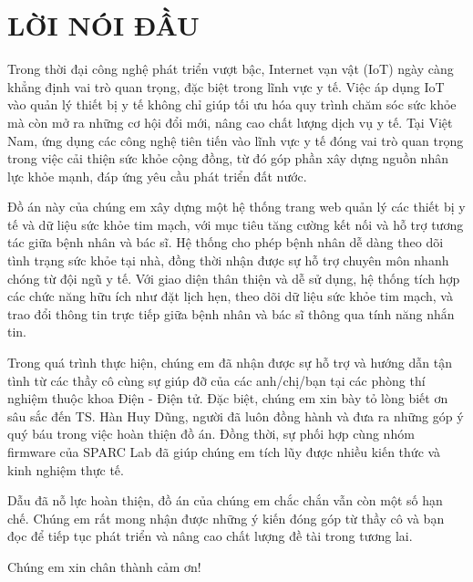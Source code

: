 \section*{LỜI NÓI ĐẦU} %
\thispagestyle{empty}
Trong thời đại công nghệ phát triển vượt bậc, Internet vạn vật (IoT) ngày càng khẳng định vai trò quan trọng, đặc biệt trong lĩnh vực y tế. Việc áp dụng IoT vào quản lý thiết bị y tế không chỉ giúp tối ưu hóa quy trình chăm sóc sức khỏe mà còn mở ra những cơ hội đổi mới, nâng cao chất lượng dịch vụ y tế.
Tại Việt Nam, ứng dụng các công nghệ tiên tiến vào lĩnh vực y tế đóng vai trò quan trọng trong việc cải thiện sức khỏe cộng đồng, từ đó góp phần xây dựng nguồn nhân lực khỏe mạnh, đáp ứng yêu cầu phát triển đất nước.

Đồ án này của chúng em xây dựng một hệ thống trang web quản lý các thiết bị y tế và dữ liệu sức khỏe tim mạch, với mục tiêu tăng cường kết nối và hỗ trợ tương tác giữa bệnh nhân và bác sĩ.
Hệ thống cho phép bệnh nhân dễ dàng theo dõi tình trạng sức khỏe tại nhà, đồng thời nhận được sự hỗ trợ chuyên môn nhanh chóng từ đội ngũ y tế. Với giao diện thân thiện và dễ sử dụng, hệ thống tích hợp các chức năng hữu ích như đặt lịch hẹn, theo dõi dữ liệu sức khỏe tim mạch, và trao đổi thông tin trực tiếp giữa bệnh nhân và bác sĩ thông qua tính năng nhắn tin.

Trong quá trình thực hiện, chúng em đã nhận được sự hỗ trợ và hướng dẫn tận tình từ các thầy cô cùng sự giúp đỡ của các anh/chị/bạn tại các phòng thí nghiệm thuộc khoa Điện - Điện tử. Đặc biệt, chúng em xin bày tỏ lòng biết ơn sâu sắc đến TS. Hàn Huy Dũng, người đã luôn đồng hành và đưa ra những góp ý quý báu trong việc hoàn thiện đồ án.
Đồng thời, sự phối hợp cùng nhóm firmware của SPARC Lab đã giúp chúng em tích lũy được nhiều kiến thức và kinh nghiệm thực tế.

Dẫu đã nỗ lực hoàn thiện, đồ án của chúng em chắc chắn vẫn còn một số hạn chế. Chúng em rất mong nhận được những ý kiến đóng góp từ thầy cô và bạn đọc để tiếp tục phát triển và nâng cao chất lượng đề tài trong tương lai.

Chúng em xin chân thành cảm ơn!



\cleardoublepage
